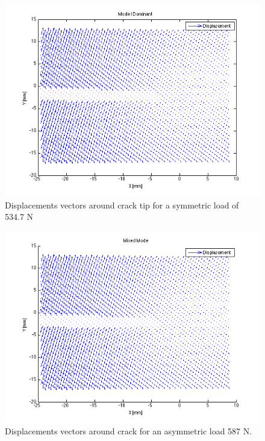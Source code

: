 \documentclass[12pt]{article}
\begin{document}
\begin{figure}[H]
	\centering
	\includegraphics[width=1\textwidth]{QuiverModeI.png}
	\caption{Displacements vectors around crack tip for a symmetric load of 534.7 N }
	\label{fig:Quiver1}
\end{figure}

\begin{figure}[H]
	\centering
	\includegraphics[width=1\textwidth]{quiverMixedMode.png}
	\caption{Displacements vectors around crack for an asymmetric load 587 N.}
	\label{fig:QuiverMix}
\end{figure}


	 
\end{document}
